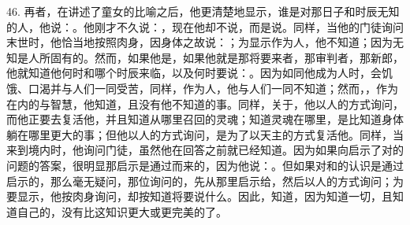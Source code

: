 46. 再者，在讲述了童女的比喻之后，他更清楚地显示，谁是对那日子和时辰无知的人，他说：。他刚才不久说：，现在他却不说，而是说。同样，当他的门徒询问末世时，他恰当地按照肉身，因身体之故说：；为显示作为人，他不知道；因为无知是人所固有的。然而，如果他是，如果他就是那将要来者，那审判者，那新郎，他就知道他何时和哪个时辰来临，以及何时要说：。因为如同他成为人时，会饥饿、口渴并与人们一同受苦，同样，作为人，他与人们一同不知道；然而，，作为在内的与智慧，他知道，且没有他不知道的事。同样，关于，他以人的方式询问，而他正要去复活他，并且知道从哪里召回的灵魂；知道灵魂在哪里，是比知道身体躺在哪里更大的事；但他以人的方式询问，是为了以天主的方式复活他。同样，当来到境内时，他询问门徒，虽然他在回答之前就已经知道。因为如果向启示了对的问题的答案，很明显那启示是通过而来的，因为他说：。但如果对和的认识是通过启示的，那么毫无疑问，那位询问的，先从那里启示给，然后以人的方式询问；为要显示，他按肉身询问，却按知道将要说什么。因此，知道，因为知道一切，且知道自己的，没有比这知识更大或更完美的了。\par


